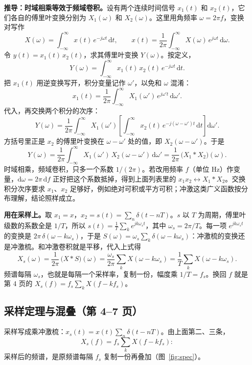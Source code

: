 \textbf{推导：时域相乘等效于频域卷积。}设有两个连续时间信号 $x_1(t)$ 和 $x_2(t)$，它们各自的傅里叶变换分别为 $X_1(\omega)$ 和 $X_2(\omega)$。这里用角频率 $\omega=2\pi f$，变换对写作
\[
X(\omega)=\int_{-\infty}^{\infty}x(t)\,e^{-j\omega t}\,\mathrm dt,\qquad
x(t)=\frac{1}{2\pi}\int_{-\infty}^{\infty}X(\omega)\,e^{j\omega t}\,\mathrm d\omega .
\]
令 $y(t)=x_1(t)\,x_2(t)$，求其傅里叶变换 $Y(\omega)$。按定义，
\[
Y(\omega)=\int_{-\infty}^{\infty}x_1(t)\,x_2(t)\,e^{-j\omega t}\,\mathrm dt .
\]
把 $x_1(t)$ 用逆变换写开，积分变量记作 $\omega'$，以免和 $\omega$ 混淆：
\[
x_1(t)=\frac{1}{2\pi}\int_{-\infty}^{\infty}X_1(\omega')\,e^{j\omega' t}\,\mathrm d\omega' .
\]
代入，再交换两个积分的次序：
\[
Y(\omega)=\frac{1}{2\pi}\int_{-\infty}^{\infty}X_1(\omega')\left[\int_{-\infty}^{\infty}x_2(t)\,e^{-j(\omega-\omega')t}\,\mathrm dt\right]\mathrm d\omega' .
\]
方括号里正是 $x_2$ 的傅里叶变换在 $\omega-\omega'$ 处的值，即 $X_2(\omega-\omega')$。于是
\[
Y(\omega)=\frac{1}{2\pi}\int_{-\infty}^{\infty}X_1(\omega')\,X_2(\omega-\omega')\,\mathrm d\omega'
=\frac{1}{2\pi}\,\big(X_1*X_2\big)(\omega).
\]
时域相乘，频域卷积，只多一个系数 $1/(2\pi)$。若改用频率 $f$（单位 Hz）作变量，$\mathrm d\omega=2\pi\,\mathrm df$ 正好把这个系数抵掉，得到上面列表里的 $x_1x_2\leftrightarrow X_1*X_2$。交换积分次序要求 $x_1$、$x_2$ 足够好，例如绝对可积或平方可积；冲激这类广义函数按分布理解，结论照样成立。

\textbf{用在采样上。}取 $x_1=x$，$x_2=s(t)=\sum_n\delta(t-nT)$。$s$ 以 $T$ 为周期，傅里叶级数的系数全是 $1/T$，所以 $s(t)=\frac1T\sum_k e^{jk\omega_s t}$，其中 $\omega_s=2\pi/T$。每一项 $e^{jk\omega_s t}$ 的变换是 $2\pi\,\delta(\omega-k\omega_s)$，于是 $S(\omega)=\omega_s\sum_k\delta(\omega-k\omega_s)$：冲激梳的变换还是冲激梳。和冲激卷积就是平移，代入上式得
\[
X_s(\omega)=\frac{1}{2\pi}\,\big(X*S\big)(\omega)=\frac{\omega_s}{2\pi}\sum_k X(\omega-k\omega_s)=\frac1T\sum_k X(\omega-k\omega_s).
\]
频谱每隔 $\omega_s$，也就是每隔一个采样率，复制一份，幅度乘 $1/T=f_s$。换回 $f$ 就是第 4 页的 $X_s(f)=f_s\sum_k X(f-kf_s)$。

\subsection{采样定理与混叠（第 4--7 页）}\label{sec:sampling}
采样写成乘冲激梳：$x_s(t)=x(t)\sum_n\delta(t-nT)$。由上面第二、三条，
\[
X_s(f)=f_s\sum_k X(f-kf_s):
\]
采样后的频谱，是原频谱每隔 $f_s$ 复制一份再叠加（图~\ref{fig:spec}）。

